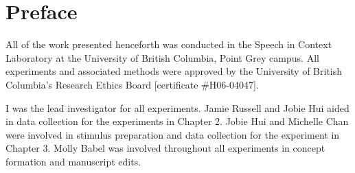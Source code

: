 
\chapter{Preface}

All of the work presented henceforth was conducted in the Speech in Context Laboratory at the University of British Columbia, Point Grey campus. 
All experiments and associated methods were approved by the University of British Columbia’s Research Ethics Board [certificate \#H06-04047].

I was the lead investigator for all experiments.  
Jamie Russell and Jobie Hui aided in data collection for the experiments in Chapter 2.  
Jobie Hui and Michelle Chan were involved in stimulus preparation and data collection for the experiment in Chapter 3.
Molly Babel was involved throughout all experiments in concept formation and manuscript edits.